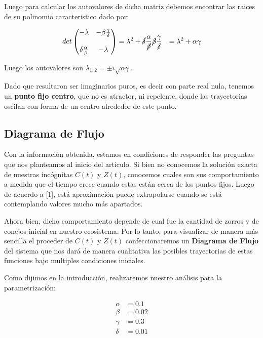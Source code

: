 \documentclass[10pt,journal,compsoc]{IEEEtran}
\begin{document}
 Luego para calcular los autovalores de dicha matriz debemos encontrar las
 raices de su polinomio caracteristico dado por:

 \begin{equation*}
  \begin{aligned}
  det \begin{pmatrix}
      -\lambda & -\beta \frac{\gamma}{\delta}\\
      & \\
      \delta \frac{\alpha}{\beta} & -\lambda
    \end{pmatrix}
    &= \lambda^{2} + \cancel{\delta} \frac{\alpha}{\cancel{\beta}}\cancel{\beta}\frac{\gamma}{\cancel{\delta}}
    &= \lambda^{2} + \alpha \gamma
  \end{aligned}
 \end{equation*}

 Luego los autovalores son $\lambda_{1,2} = \pm i\sqrt{\alpha \gamma}$.
 
 Dado que resultaron ser imaginarios puros, es decir con parte real nula,
 tenemos un \textbf{punto fijo centro}, que no es atractor, ni repelente, donde
 las trayectorias oscilan con forma de un centro alrededor de este punto.

 \subsection{Diagrama de Flujo}

 Con la información obtenida, estamos en condiciones de responder las preguntas
 que nos planteamos al inicio del articulo. Si bien no conocemos la solución
 exacta de nuestras incógnitas $C(t)$ y $Z(t)$, conocemos cuales son sus
 comportamiento a medida que el tiempo crece cuando estas están cerca de los
 puntos fijos. Luego de acuerdo a [1], está aproximación puede extrapolarse
 cuando se está contemplando valores mucho más apartados.
 
 Ahora bien, dicho comportamiento depende de cual fue la cantidad de zorros y de
 conejos inicial en nuestro ecosistema. Por lo tanto, para visualizar de manera
 más sencilla el proceder de $C(t)$ y $Z(t)$ confeccionaremos un
 \textbf{Diagrama de Flujo} del sistema que nos dará de manera cualitativa las
 posibles trayectorias de estas funciones bajo multiples condiciones iniciales.

 Como dijimos en la introducción, realizaremos nuestro análisis para la
 parametrización:

 \begin{equation*}
  \begin{aligned}
   \alpha &= 0.1\\
   \beta &= 0.02\\
   \gamma &= 0.3\\
   \delta &= 0.01
  \end{aligned}
 \end{equation*}
\end{document}
